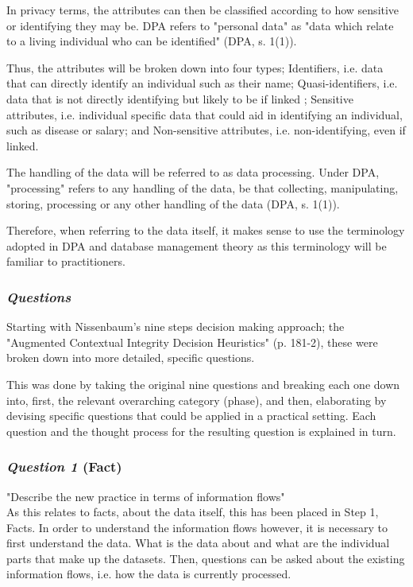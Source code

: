 In privacy terms, the attributes can then be classified according to how sensitive or identifying they may be. DPA refers to "personal data" as "data which relate to a living individual who can be identified" (DPA, s. 1(1)). 

Thus, the attributes will be broken down into four types; Identifiers, i.e. data that can directly identify an individual such as their name; Quasi-identifiers, i.e. data that is not directly identifying but likely to be if linked \cite{Thomson_et_al_2005}; Sensitive attributes, i.e. individual specific data that could aid in identifying an individual, such as disease or salary\cite{Fung_et_al_2010}; and Non-sensitive attributes, i.e. non-identifying, even if linked.

The handling of the data will be referred to as data processing. Under DPA, "processing" refers to any handling of the data, be that collecting, manipulating, storing, processing or any other handling of the data (DPA, s. 1(1)). 

Therefore, when referring to the data itself, it makes sense to use the terminology adopted in DPA and database management theory as this terminology will be familiar to practitioners.
 
\subsubsection {{\it Questions}}

Starting with Nissenbaum's nine steps decision making approach; the "Augmented Contextual Integrity Decision Heuristics" (p. 181-2), these were broken down into more detailed, specific questions.

This was done by taking the original nine questions and breaking each one down into, first, the relevant overarching category (phase), and then, elaborating by devising specific questions that could be applied in a practical setting. Each question and the thought process for the resulting question is explained in turn.

\subsubsection {{\it Question 1} {\bf (Fact)}}

"Describe the new practice in terms of information flows" \cite{Nissenbaum_2010}\\

As this relates to facts, about the data itself, this has been placed in Step 1, Facts. In order to understand the information flows however, it is necessary to first understand the data. What is the data about and what are the individual parts that make up the datasets. Then, questions can be asked about the existing information flows, i.e. how the data is currently processed.

